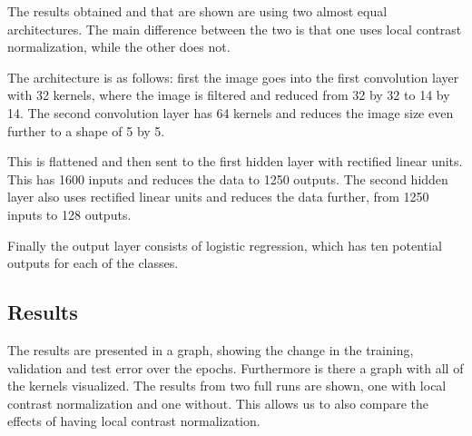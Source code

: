The results obtained and that are shown are using two almost equal architectures. The main difference between the two is that one uses local contrast normalization, while the other does not.

The architecture is as follows: first the image goes into the first convolution layer with 32 kernels, where the image is filtered and reduced from 32 by 32 to 14 by 14. The second convolution layer has 64 kernels and reduces the image size even further to a shape of 5 by 5. 

This is flattened and then sent to the first hidden layer with rectified linear units. This has 1600 inputs and reduces the data to 1250 outputs. The second hidden layer also uses rectified linear units and reduces the data further, from 1250 inputs to 128 outputs. 

Finally the output layer consists of logistic regression, which has ten potential outputs for each of the classes.

\subsection*{Results}
The results are presented in a graph, showing the change in the training, validation and test error over the epochs. Furthermore is there a graph with all of the kernels visualized. The results from two full runs are shown, one with local contrast normalization and one without. This allows us to also compare the effects of having local contrast normalization.

